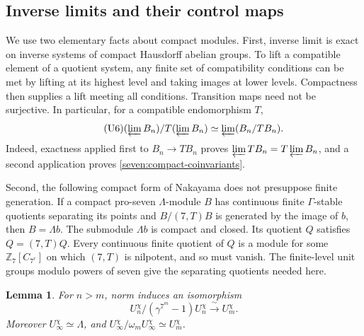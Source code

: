 \documentclass[11pt]{article}
\newtheorem{lemma}[theorem]{Lemma}
\begin{document}
\subsection{Inverse limits and their control maps}

We use two elementary facts about compact modules. First, inverse
limit is exact on inverse systems of compact Hausdorff abelian groups.
To lift a compatible element of a quotient system, any finite set of
compatibility conditions can be met by lifting at its highest level
and taking images at lower levels. Compactness then supplies a lift
meeting all conditions. Transition maps need not be surjective.
In particular, for a compatible endomorphism $T$,
\begin{equation*}\tag{U6}\label{seven:compact-coinvariants}
 (\varprojlim B_n)/T(\varprojlim B_n)
 \simeq\varprojlim(B_n/TB_n).
\end{equation*}
Indeed, exactness applied first to $B_n\to TB_n$ proves
$\varprojlim TB_n=T\varprojlim B_n$, and a second application proves
\eqref{seven:compact-coinvariants}.

Second, the following compact form of Nakayama does not presuppose
finite generation. If a compact pro-seven $\Lambda$-module $B$ has
continuous finite $\Gamma$-stable quotients separating its points and
$B/(7,T)B$ is generated by the image of $b$, then $B=\Lambda b$.
The submodule $\Lambda b$ is compact and closed. Its quotient $Q$
satisfies $Q=(7,T)Q$. Every continuous finite quotient of $Q$ is a
module for some $\mathbb Z_7[C_{7^r}]$ on which $(7,T)$ is nilpotent,
and so must vanish. The finite-level unit groups modulo powers of
seven give the separating quotients needed here.

\begin{lemma}\label{seven:local-unit-control}
For $n>m$, norm induces an isomorphism
\[
 U_n^\chi/(\gamma^{7^m}-1)U_n^\chi
 \xrightarrow{\ \sim\ }U_m^\chi.
\]
Moreover $U_\infty^\chi\simeq\Lambda$, and
$U_\infty^\chi/\omega_mU_\infty^\chi\simeq U_m^\chi$.
\end{lemma}
\end{document}
